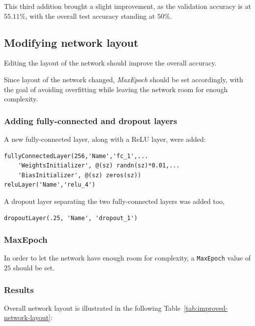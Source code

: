 \documentclass[a4paper, 11pt]{article} %
\begin{document}
This third addition brought a slight improvement, as the validation accuracy is at $55.11\%$, with the overall test accuracy standing at $50\%$.

\subsection{Modifying network layout}

Editing the layout of the network should improve the overall accuracy.

Since layout of the network changed, \emph{MaxEpoch} should be set accordingly, with the goal of avoiding overfitting while leaving the network room for enough complexity.

\subsubsection{Adding fully-connected and dropout layers}

A new fully-connected layer, along with a ReLU layer, were added:

\begin{lstlisting}
fullyConnectedLayer(256,'Name','fc_1',...
    'WeightsInitializer', @(sz) randn(sz)*0.01,...
    'BiasInitializer', @(sz) zeros(sz))
reluLayer('Name','relu_4')
\end{lstlisting}

A dropout layer separating the two fully-connected layers was added too,

\begin{lstlisting}
dropoutLayer(.25, 'Name', 'dropout_1')
\end{lstlisting}

\subsubsection{MaxEpoch}

In order to let the network have enough room for complexity, a \texttt{MaxEpoch} value of $25$ should be set.

\subsubsection{Results}\label{sec:results}

Overall network layout is illustrated in the following Table~\ref{tab:improved-network-layout}:
\end{document}
